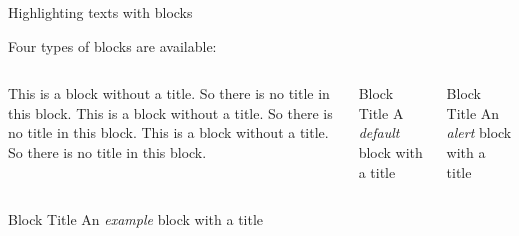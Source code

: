 \documentclass[12pt]{beamer}
\begin{document}
{
\begin{frame}

 \color{UMYellow}{\bf\Large Use UMBlue as background color.}

\end{frame}
}



\begin{frame}{{\color{UMYellow} Highlighting} texts with blocks}

Four types of blocks are available:
\bigskip

\begin{columns}
		\begin{block}{}
		This is a block without a title. So there is no title in this block. This is a block without a title. So there is no title in this block. This is a block without a title. So there is no title in this block. 

		\end{block}
		\begin{block}{Block Title}
		A \emph{default} block with a title
		\end{block}

		\begin{alertblock}{Block Title}
		An \emph{alert} block with a title
		\end{alertblock}

\end{columns} 
		\begin{exampleblock}{Block Title}
		An \emph{example} block with a title
		\end{exampleblock}
\end{frame}
\end{document}
